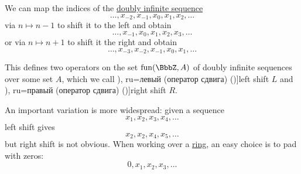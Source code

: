 \begin{definition}\label{def:shift_operator}\mimprovised
  We can map the indices of the \hyperref[def:doubly_infinite_sequence]{doubly infinite sequence}
  \begin{equation*}
    \ldots, x_{-2}, x_{-1}, x_0, x_1, x_2, \ldots
  \end{equation*}
  via \( n \mapsto n - 1 \) to shift it to the left and obtain
  \begin{equation*}
    \ldots, x_{-1}, x_0, x_1, x_2, x_3, \ldots
  \end{equation*}
  or via \( n \mapsto n + 1 \) to shift it the right and obtain
  \begin{equation*}
    \ldots, x_{-3}, x_{-2}, x_{-1}, x_0, x_1, \ldots
  \end{equation*}

  This defines two operators on the set \( \fun(\BbbZ, A) \) of doubly infinite sequences over some set \( A \), which we call \term[en=left shift (operator) (\cite[exerc. 7.26]{FabianEtAl2001FunctionalAnalysis}), ru=левый (оператор сдвига) (\cite[example 1.3.3]{Хелемский2014ФункциональныйАнализ})]{left shift} \( L \) and \term[en=right shift (operator) (\cite[exerc. 7.26]{FabianEtAl2001FunctionalAnalysis}), ru=правый (оператор сдвига) (\cite[example 1.3.3]{Хелемский2014ФункциональныйАнализ})]{right shift} \( R \).

  An important variation is more widespread: given a sequence
  \begin{equation*}
    x_1, x_2, x_3, x_4, \ldots
  \end{equation*}
  left shift gives
  \begin{equation*}
    x_2, x_2, x_4, x_5, \ldots
  \end{equation*}
  but right shift is not obvious. When working over a \hyperref[def:ring]{ring}, an easy choice is to pad with zeros:
  \begin{equation*}
    0, x_1, x_2, x_3, \ldots
  \end{equation*}
\end{definition}
